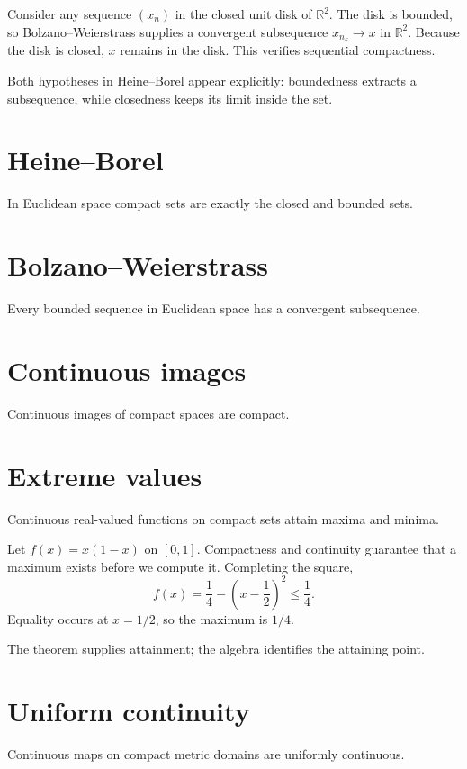 \begin{example}\label{ex:ii06-expand-01}
Consider any sequence \((x_n)\) in the closed unit disk of \(\mathbb R^2\).
The disk is bounded, so Bolzano--Weierstrass supplies a convergent subsequence
\(x_{n_k}\to x\) in \(\mathbb R^2\). Because the disk is closed, \(x\) remains
in the disk. This verifies sequential compactness.

Both hypotheses in Heine--Borel appear explicitly: boundedness extracts a
subsequence, while closedness keeps its limit inside the set.
\end{example}
\section{Heine--Borel}
In Euclidean space compact sets are exactly the closed and bounded sets.

\section{Bolzano--Weierstrass}
Every bounded sequence in Euclidean space has a convergent subsequence.

\section{Continuous images}
Continuous images of compact spaces are compact.

\section{Extreme values}
Continuous real-valued functions on compact sets attain maxima and minima.


\begin{example}\label{ex:ii06-expand-02}
Let \(f(x)=x(1-x)\) on \([0,1]\). Compactness and continuity guarantee that a
maximum exists before we compute it. Completing the square,
\[
f(x)=\frac14-\left(x-\frac12\right)^2\le\frac14.
\]
Equality occurs at \(x=1/2\), so the maximum is \(1/4\).

The theorem supplies attainment; the algebra identifies the attaining point.
\end{example}
\section{Uniform continuity}
Continuous maps on compact metric domains are uniformly continuous.

